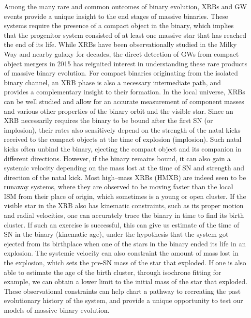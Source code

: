 \documentclass[linenumbers,trackchanges,twocolumn]{aastex701}
\begin{document}
Among the many rare and common outcomes of binary evolution, XRBs and GW events provide a unique insight to the end stages of massive binaries. These systems require the presence of a compact object in the binary, which implies that the progenitor system consisted of at least one massive star that has reached the end of its life. While XRBs have been observationally studied in the Milky Way and nearby galaxy for decades, the direct detection of GWs from compact object mergers in 2015 has reignited interest in understanding these rare products of massive binary evolution. For compact binaries originating from the isolated binary channel, an XRB phase is also a necessary intermediate path, and provides a complementary insight to their formation. In the local universe, XRBs can be well studied and allow for an accurate measurement of component masses and various other properties of the binary orbit and the visible star. Since an XRB necessarily requires the binary to be bound after the first SN (or implosion), their rates also sensitively depend on the strength of the natal kicks received to the compact objects at the time of explosion (implosion). Such natal kicks often unbind the binary, ejecting the compact object and its companion in different directions. However, if the binary remains bound, it can also gain a systemic velocity depending on the mass lost at the time of SN and strength and direction of the natal kick. Most high--mass XRBs (HMXB) are indeed seen to be runaway systems, where they are observed to be moving faster than the local ISM from their place of origin, which sometimes is a young or open cluster. If the visible star in the XRB also has kinematic constraints, such as its proper motion and radial velocities, one can accurately trace the binary in time to find its birth cluster. If such an exercise is successful, this can give us estimate of the time of SN in the binary (kinematic age), under the hypothesis that the system got ejected from its birthplace when one of the stars in the binary ended its life in an explosion. The systemic velocity can also constraint the amount of mass lost in the explosion, which sets the pre-SN mass of the star that exploded. If one is also able to estimate the age of the birth cluster, through isochrone fitting for example, we can obtain a lower limit to the initial mass of the star that exploded. These observational constraints can help chart a pathway to recreating the past evolutionary history of the system, and provide a unique opportunity to test our models of massive binary evolution.  
\end{document}
